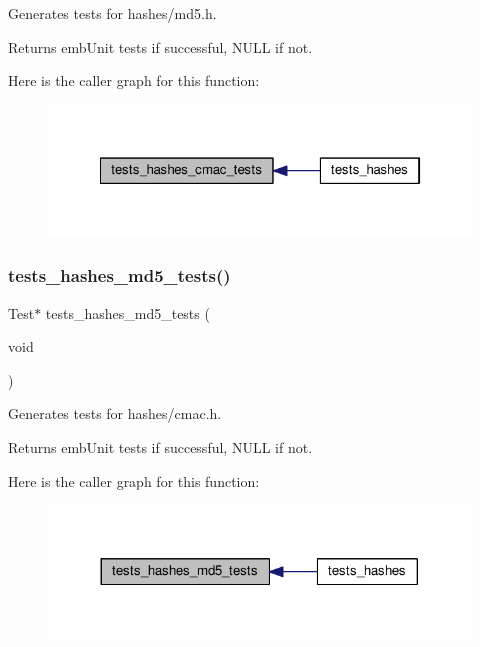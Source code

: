 Generates tests for hashes/md5.\+h. 

\begin{DoxyReturn}{Returns}
emb\+Unit tests if successful, N\+U\+LL if not. 
\end{DoxyReturn}
Here is the caller graph for this function\+:
\nopagebreak
\begin{figure}[H]
\begin{center}
\leavevmode
\includegraphics[width=322pt]{group__unittests_ga1a28ef20665a197204a84eb23688d340_icgraph}
\end{center}
\end{figure}
\mbox{\label{group__unittests_ga256959a65e4f795eac3581259fb3e48a}} 
\subsubsection{\texorpdfstring{tests\+\_\+hashes\+\_\+md5\+\_\+tests()}{tests\_hashes\_md5\_tests()}}
{\footnotesize\ttfamily Test$\ast$ tests\+\_\+hashes\+\_\+md5\+\_\+tests (\begin{DoxyParamCaption}\item[{void}]{ }\end{DoxyParamCaption})}



Generates tests for hashes/cmac.\+h. 

\begin{DoxyReturn}{Returns}
emb\+Unit tests if successful, N\+U\+LL if not. 
\end{DoxyReturn}
Here is the caller graph for this function\+:
\nopagebreak
\begin{figure}[H]
\begin{center}
\leavevmode
\includegraphics[width=317pt]{group__unittests_ga256959a65e4f795eac3581259fb3e48a_icgraph}
\end{center}
\end{figure}
\mbox{\label{group__unittests_ga5567d66422cdc40775eeacf6fa796893}} 
